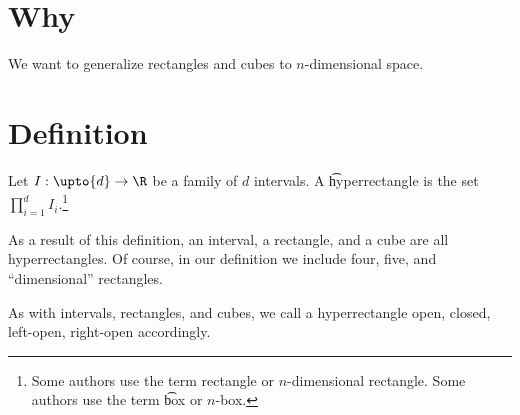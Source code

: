 

\section*{Why}

We want to generalize rectangles and cubes to $n$-dimensional space.

\section*{Definition}

Let $I: \upto{d} \to \R $ be a family of $d$ intervals.
A \t{hyperrectangle} is the set $\prod_{i=1}^{d} I_i$.\footnote{Some authors use the term rectangle or \t{$n$-dimensional rectangle}.
Some authors use the term \t{box} or \t{$n$-box}.}

As a result of this definition, an interval, a rectangle, and a cube are all hyperrectangles.
Of course, in our definition we include four, five, and ``dimensional'' rectangles.

As with intervals, rectangles, and cubes, we call a hyperrectangle open, closed, left-open, right-open accordingly.

\blankpage